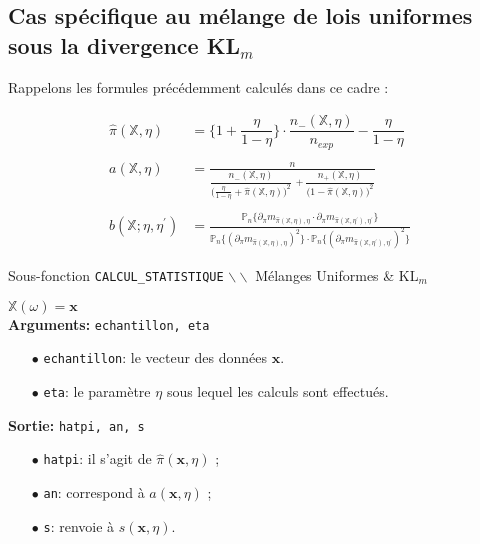 \documentclass{article}
\newenvironment{fonction}[1][htb]
  {\renewcommand{\algorithmcfname}{Fonction}%
   \begin{algorithm}[#1]%
  }{\end{algorithm}}
\begin{document}
    \subsection{Cas spécifique au mélange de lois uniformes sous la divergence KL$_m$}

    Rappelons les formules précédemment calculés dans ce cadre :

    \begin{align*}
        \hat\pi(\mathbb{X},\eta) & = \{1+\dfrac{\eta}{1-\eta}\}\cdot\dfrac{n_-(\mathbb{X},\eta)}{n_{exp}} - \dfrac{\eta}{1-\eta} \\
        \mathrm{} \\
        a(\mathbb{X},\eta) & = \frac{n}{\dfrac{n_{-}(\mathbb{X},\eta)}{\Big(\frac{\eta}{1-\eta}+\hat\pi(\mathbb{X},\eta)\Big)^2}\, + \dfrac{n_{+}(\mathbb{X},\eta)}{\Big(1-\hat\pi(\mathbb{X},\eta)\Big)^2}} \\
        \mathrm{} \\
        b(\mathbb{X};\eta,\eta^\prime) & = \frac{\mathbb{P}_n\{ \partial_\pi m_{\hat\pi(\mathbb{X},\eta),\eta}\cdot\partial_\pi m_{\hat\pi(\mathbb{X},\eta^\prime),\eta^\prime}\}}{\mathbb{P}_n \{(\partial_\pi m_{\hat\pi(\mathbb{X},\eta),\eta})^2\}\cdot\mathbb{P}_n \{(\partial_\pi m_{\hat\pi(\mathbb{X},\eta^\prime),\eta^\prime})^2\}} 
    \end{align*}


    \begin{fonction}
        \caption{Sous-fonction \texttt{CALCUL\_STATISTIQUE} $\backslash\backslash$ Mélanges Uniformes \& KL$_m$}
        \Apriori $\mathbb{X}(\omega)=\mathbf{x}$ \\
        \vspace*{0.2cm}
        \textbf{Arguments:} \texttt{echantillon, eta}
        \begin{itemize}
            \item[$\bullet$] \texttt{echantillon}: le vecteur des données $\mathbf{x}$.
            \item[$\bullet$] \texttt{eta}: le paramètre $\eta$ sous lequel les calculs sont effectués. 
        \end{itemize}
        \textbf{Sortie:} \texttt{hatpi, an, s}
        \begin{itemize}
            \item[$\bullet$] \texttt{hatpi}: il s'agit de $\hat\pi(\mathbf{x},\eta)$ ;
            \item[$\bullet$] \texttt{an}: correspond à $a(\mathbf{x},\eta)$ ;
            \item[$\bullet$] \texttt{s}: renvoie à $s(\mathbf{x},\eta)$.   
        \end{itemize}
    \end{fonction}
\end{document}
